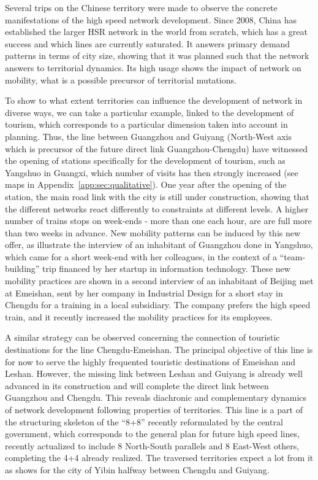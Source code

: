 
Several trips on the Chinese territory were made to observe the concrete manifestations of the high speed network development. Since 2008, China has established the larger HSR network in the world from scratch, which has a great success and which lines are currently saturated. It answers primary demand patterns in terms of city size, showing that it was planned such that the network answers to territorial dynamics. Its high usage shows the impact of network on mobility, what is a possible precursor of territorial mutations.

To show to what extent territories can influence the development of network in diverse ways, we can take a particular example, linked to the development of tourism, which corresponds to a particular dimension taken into account in planning. Thus, the line between Guangzhou and Guiyang (North-West axis which is precursor of the future direct link Guangzhou-Chengdu) have witnessed the opening of stations specifically for the development of tourism, such as Yangshuo in Guangxi, which number of visits has then strongly increased (see maps in Appendix~\ref{app:sec:qualitative}). One year after the opening of the station, the main road link with the city is still under construction, showing that the different networks react differently to constraints at different levels. A higher number of trains stops on week-ends - more than one each hour, are are full more than two weeks in advance. New mobility patterns can be induced by this new offer, as illustrate the interview of an inhabitant of Guangzhou done in Yangshuo, which came for a short week-end with her colleagues, in the context of a ``team-building'' trip financed by her startup in information technology. These new mobility practices are shown in a second interview of an inhabitant of Beijing met at Emeishan, sent by her company in Industrial Design for a short stay in Chengdu for a training in a local subsidiary. The company prefers the high speed train, and it recently increased the mobility practices for its employees.

A similar strategy can be observed concerning the connection of touristic destinations for the line Chengdu-Emeishan. The principal objective of this line is for now to serve the highly frequented touristic destinations of Emeishan and Leshan. However, the missing link between Leshan and Guiyang is already well advanced in its construction and will complete the direct link between Guangzhou and Chengdu. This reveals diachronic and complementary dynamics of network development following properties of territories. This line is a part of the structuring skeleton of the ``8+8'' recently reformulated by the central government, which corresponds to the general plan for future high speed lines, recently actualized to include 8 North-South parallels and 8 East-West others, completing the 4+4 already realized.  The traversed territories expect a lot from it as shows \cite{lu2012chengdu} for the city of Yibin halfway between Chengdu and Guiyang.

